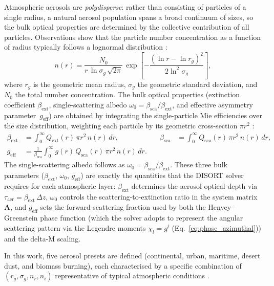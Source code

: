 \documentclass[a4paper, 11pt]{article}
\begin{document}
Atmospheric aerosols are \textit{polydisperse}: rather than consisting
of particles of a single radius, a natural aerosol population spans a
broad continuum of sizes, so the bulk optical properties are determined
by the collective contribution of all particles.  Observations show
that the particle number concentration as a function of radius
typically follows a lognormal distribution
\cite{seinfeld2016,hess1998}:
%
\begin{equation}
  n(r) = \frac{N_0}{r\,\ln\sigma_g\,\sqrt{2\pi}}\,
  \exp\!\left[-\frac{(\ln r - \ln r_g)^2}{2\ln^2\sigma_g}\right],
  \label{eq:lognormal}
\end{equation}
%
where $r_g$ is the geometric mean radius, $\sigma_g$ the geometric
standard deviation, and $N_0$ the total number concentration.  The
bulk optical properties (extinction coefficient $\beta_{\text{ext}}$,
single-scattering albedo $\omega_0 = \beta_{\text{sca}}/\beta_{\text{ext}}$,
and effective asymmetry parameter~$g_{\text{eff}}$) are obtained by
integrating the single-particle Mie efficiencies over the size
distribution, weighting each particle by its geometric cross-section
$\pi r^2$ \cite{bohren1983}:
%
\begin{align}
  \beta_{\text{ext}} &= \int_0^{\infty}
    Q_{\text{ext}}(r)\,\pi r^2\,n(r)\,dr,
  &\quad
  \beta_{\text{sca}} &= \int_0^{\infty}
    Q_{\text{sca}}(r)\,\pi r^2\,n(r)\,dr,
  \label{eq:bulk_ext_sca}\\[4pt]
  g_{\text{eff}} &= \frac{1}{\beta_{\text{sca}}}\int_0^{\infty}
    g(r)\,Q_{\text{sca}}(r)\,\pi r^2\,n(r)\,dr.
  \label{eq:geff}
\end{align}
%
The single-scattering albedo follows as
$\omega_0 = \beta_{\text{sca}}/\beta_{\text{ext}}$.
These three bulk parameters ($\beta_{\text{ext}}$, $\omega_0$,
$g_{\text{eff}}$) are exactly the quantities that the DISORT solver
requires for each atmospheric layer: $\beta_{\text{ext}}$ determines
the aerosol optical depth via $\tau_{\text{aer}} = \beta_{\text{ext}}\,\Delta z$,
$\omega_0$ controls the scattering-to-extinction ratio in the system
matrix~$\mathbf{A}$, and $g_{\text{eff}}$ sets the forward-scattering
fraction used by both the Henyey--Greenstein phase function (which
the solver adopts to represent the angular scattering pattern via the
Legendre moments $\chi_l = g^l$ (Eq.~\ref{eq:phase_azimuthal})) and the
delta-M scaling.

In this work, five aerosol presets are defined (continental, urban,
maritime, desert dust, and biomass burning), each characterised by a
specific combination of $(r_g, \sigma_g, n_r, n_i)$ representative of
typical atmospheric conditions \cite{hess1998}.
\end{document}
